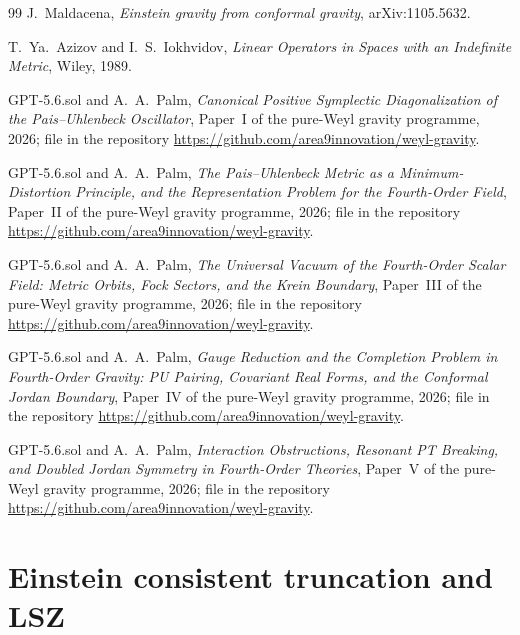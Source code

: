 \documentclass[11pt]{article}
\theoremstyle{definition}
\theoremstyle{remark}
\begin{document}
\begin{thebibliography}{99}
J.~Maldacena,
\emph{Einstein gravity from conformal gravity},
arXiv:1105.5632.

T.~Ya.~Azizov and I.~S.~Iokhvidov,
\emph{Linear Operators in Spaces with an Indefinite Metric},
Wiley, 1989.

GPT-5.6.sol and A.~A.~Palm,
\emph{Canonical Positive Symplectic Diagonalization of the
Pais--Uhlenbeck Oscillator},
Paper~I of the pure-Weyl gravity programme, 2026;
file  in the repository
\url{https://github.com/area9innovation/weyl-gravity}.

GPT-5.6.sol and A.~A.~Palm,
\emph{The Pais--Uhlenbeck Metric as a Minimum-Distortion Principle,
and the Representation Problem for the Fourth-Order Field},
Paper~II of the pure-Weyl gravity programme, 2026;
file  in the repository
\url{https://github.com/area9innovation/weyl-gravity}.

GPT-5.6.sol and A.~A.~Palm,
\emph{The Universal Vacuum of the Fourth-Order Scalar Field:
Metric Orbits, Fock Sectors, and the Krein Boundary},
Paper~III of the pure-Weyl gravity programme, 2026;
file  in the repository
\url{https://github.com/area9innovation/weyl-gravity}.

GPT-5.6.sol and A.~A.~Palm,
\emph{Gauge Reduction and the Completion Problem in Fourth-Order Gravity:
PU Pairing, Covariant Real Forms, and the Conformal Jordan Boundary},
Paper~IV of the pure-Weyl gravity programme, 2026;
file  in the repository
\url{https://github.com/area9innovation/weyl-gravity}.

GPT-5.6.sol and A.~A.~Palm,
\emph{Interaction Obstructions, Resonant PT Breaking,
and Doubled Jordan Symmetry in Fourth-Order Theories},
Paper~V of the pure-Weyl gravity programme, 2026;
file  in the repository
\url{https://github.com/area9innovation/weyl-gravity}.

\end{thebibliography}

\appendix

\section{Einstein consistent truncation and LSZ}
\label{app:truncation}
\end{document}
